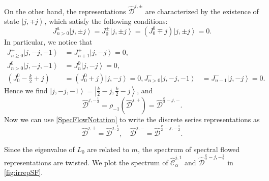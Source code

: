 \documentclass[10pt,a4paper]{article}
\numberwithin{equation}{section}
\newcommand{\ket}[1]{\left| #1 \right\rangle}
\begin{document}
On the other hand, the representations $\hat{\mathcal{D}}^{j,\pm}$ are characterized by the existence of state $\ket{j,\mp j}$, 
which satisfy the following conditions:
\begin{equation}
    J^{a}_{n>0} \ket{j,\pm j} = J^{\pm}_{0} \ket{j,\pm j} = (J^{0}_{0} \mp j) \ket{j,\pm j} =0.
\end{equation}
In particular, we notice that 
\begin{equation}
    \begin{aligned}
        J^{+}_{n \geq 0} \ket{j,-j,-1} &= J^{+}_{n+1} \ket{j,-j}  = 0, \\
        J^{0}_{n > 0} \ket{j,-j,-1} & =  J^{0}_{n}\ket{j,-j} = 0,\\
        \left(J^{0}_{0} - \frac{k}{2} +j \right) & = \left( J^{0}_{0} + j \right) \ket{j,-j} = 0,
        J^{-}_{n>0} \ket{j,-j,-1} &= J^{-}_{n-1} \ket{j,-j}   =  0.
    \end{aligned}
\end{equation}
Hence we find $\ket{j,-j,-1} = \ket{\frac{k}{2}-j, \frac{k}{2}-j}$, and 
\begin{equation}
    \hat{\mathcal{D}}^{j,-\frac{1}{2}} = \rho_{-1} \left( \hat{\mathcal{D}}^{j,+} \right) = \hat{\mathcal{D}}^{\frac{k}{2}-j,-}.
\end{equation}
Now we can use \ref{SpecFlowNotation} to write the discrete series representations as 
\begin{equation}
    \widehat{\mathcal{D}}^{j,+} = \widehat{\mathcal{D}}^{j,\frac{1}{2}},\quad \widehat{\mathcal{D}}^{j,-} = \widehat{\mathcal{D}}^{\frac{k}{2}-j,-\frac{1}{2}}.
\end{equation}

Since the eigenvalue of $L_{0}$ are related to $m$, the spectrum of spectral flowed representations 
are twisted. We plot the spectrum of $\widehat{\mathcal{C}}^{j,1}_{\alpha}$ and $\widehat{\mathcal{D}}^{\frac{k}{2}-j, -\frac{1}{2}}$ 
in \ref{fig:irrepSF}.
\end{document}
